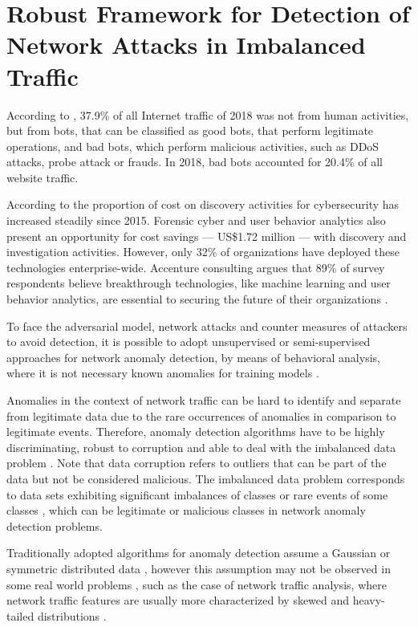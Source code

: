 \chapter{Robust Framework for Detection of Network Attacks in Imbalanced Traffic}
\label{ch:4_m_rpca}

According to \cite{distilnetworks2019}, 37.9\% of all Internet traffic of 2018 was not from human activities, but from bots, that can be classified as good bots, that perform legitimate operations, and bad bots, which perform malicious activities, such as DDoS attacks, probe attack or frauds. In 2018, bad bots accounted for 20.4\% of all website traffic.

According to \cite{BISSELL2019} the proportion of cost on discovery activities for cybersecurity has increased steadily since 2015. Forensic cyber and user behavior analytics also present an opportunity for cost savings — US\$1.72 million — with discovery and investigation activities. However, only 32\% of organizations have deployed these technologies enterprise-wide. Accenture consulting argues that 89\% of survey respondents believe breakthrough technologies, like machine learning and user behavior analytics, are essential to securing the future of their organizations \cite{Accenture2018}.

To face the adversarial model, network attacks and counter measures of attackers to avoid detection, it is possible to adopt unsupervised or semi-supervised approaches for network anomaly detection, by means of behavioral analysis, where it is not necessary known anomalies for training models \cite{moustafa2019holistic}. 

Anomalies in the context of network traffic can be hard to identify and separate from legitimate data due to the rare occurrences of anomalies in comparison to legitimate events. Therefore, anomaly detection algorithms have to be highly discriminating, robust to corruption and able to deal with the imbalanced data problem \cite{he2008learning}. Note that data corruption refers to outliers that can be part of the data but not be considered malicious. The imbalanced data problem corresponds to data sets exhibiting significant imbalances of classes or rare events of some classes \cite{he2009learning}, which can be legitimate or malicious classes in network anomaly detection problems.

Traditionally adopted algorithms for anomaly detection assume a Gaussian or symmetric distributed data \cite{lakhina2005mining}, however this assumption may not be observed in some real world problems \cite{benson2010network}, such as the case of network traffic analysis, where network traffic features are usually more characterized by skewed and heavy-tailed distributions \cite{leon2017probability}.

